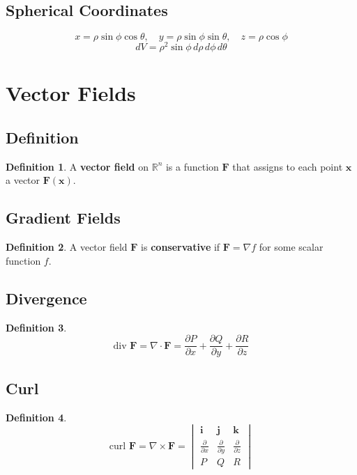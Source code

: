 \documentclass[11pt]{article}
\theoremstyle{definition}
\newtheorem{definition}{Definition}[section]
\begin{document}
\subsection{Spherical Coordinates}
$$x = \rho\sin\phi\cos\theta, \quad y = \rho\sin\phi\sin\theta, \quad z = \rho\cos\phi$$
$$dV = \rho^2\sin\phi \, d\rho \, d\phi \, d\theta$$

\section{Vector Fields}

\subsection{Definition}
\begin{definition}
A \textbf{vector field} on $\mathbb{R}^n$ is a function $\mathbf{F}$ that assigns to each point $\mathbf{x}$ a vector $\mathbf{F}(\mathbf{x})$.
\end{definition}

\subsection{Gradient Fields}
\begin{definition}
A vector field $\mathbf{F}$ is \textbf{conservative} if $\mathbf{F} = \nabla f$ for some scalar function $f$.
\end{definition}

\subsection{Divergence}
\begin{definition}
$$\text{div } \mathbf{F} = \nabla \cdot \mathbf{F} = \frac{\partial P}{\partial x} + \frac{\partial Q}{\partial y} + \frac{\partial R}{\partial z}$$
\end{definition}

\subsection{Curl}
\begin{definition}
$$\text{curl } \mathbf{F} = \nabla \times \mathbf{F} = \begin{vmatrix}
\mathbf{i} & \mathbf{j} & \mathbf{k} \\
\frac{\partial}{\partial x} & \frac{\partial}{\partial y} & \frac{\partial}{\partial z} \\
P & Q & R
\end{vmatrix}$$
\end{definition}
\end{document}
